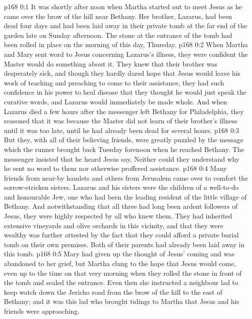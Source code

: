 \author{Midwayer Commission}
\vs p168 0:1 It was shortly after noon when Martha started out to meet Jesus as he came over the brow of the hill near Bethany. Her brother, Lazarus, had been dead four days and had been laid away in their private tomb at the far end of the garden late on Sunday afternoon. The stone at the entrance of the tomb had been rolled in place on the morning of this day, Thursday.
\vs p168 0:2 When Martha and Mary sent word to Jesus concerning Lazarus’s illness, they were confident the Master would do something about it. They knew that their brother was desperately sick, and though they hardly dared hope that Jesus would leave his work of teaching and preaching to come to their assistance, they had such confidence in his power to heal disease that they thought he would just speak the curative words, and Lazarus would immediately be made whole. And when Lazarus died a few hours after the messenger left Bethany for Philadelphia, they reasoned that it was because the Master did not learn of their brother’s illness until it was too late, until he had already been dead for several hours.
\vs p168 0:3 But they, with all of their believing friends, were greatly puzzled by the message which the runner brought back Tuesday forenoon when he reached Bethany. The messenger insisted that he heard Jesus say,  Neither could they understand why he sent no word to them nor otherwise proffered assistance.
\vs p168 0:4 Many friends from near\hyp{}by hamlets and others from Jerusalem came over to comfort the sorrow\hyp{}stricken sisters. Lazarus and his sisters were the children of a well\hyp{}to\hyp{}do and honourable Jew, one who had been the leading resident of the little village of Bethany. And notwithstanding that all three had long been ardent followers of Jesus, they were highly respected by all who knew them. They had inherited extensive vineyards and olive orchards in this vicinity, and that they were wealthy was further attested by the fact that they could afford a private burial tomb on their own premises. Both of their parents had already been laid away in this tomb.
\vs p168 0:5 Mary had given up the thought of Jesus’ coming and was abandoned to her grief, but Martha clung to the hope that Jesus would come, even up to the time on that very morning when they rolled the stone in front of the tomb and sealed the entrance. Even then she instructed a neighbour lad to keep watch down the Jericho road from the brow of the hill to the east of Bethany; and it was this lad who brought tidings to Martha that Jesus and his friends were approaching.
